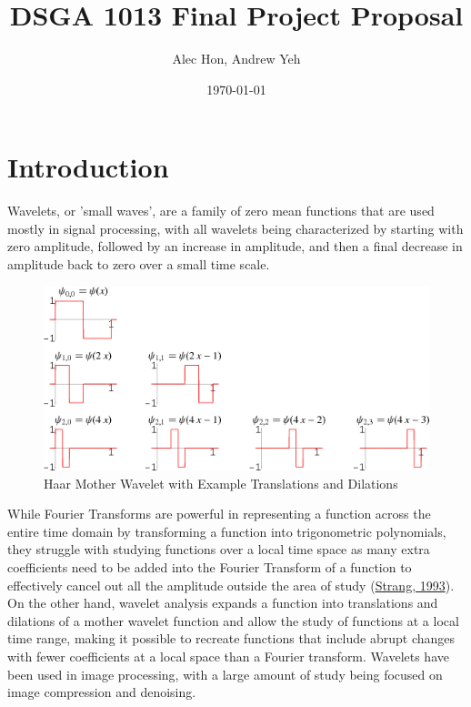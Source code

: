 \documentclass{article}
\begin{document}
\title{\large DSGA 1013 Final Project Proposal}
\author{\small Alec Hon, Andrew Yeh}
\date{\footnotesize \today}
\maketitle

\section{Introduction}

Wavelets, or 'small waves', are a family of zero mean functions that are used mostly in signal processing, with all wavelets being characterized by starting with zero amplitude, followed by an increase in amplitude, and then a final decrease in amplitude back to zero over a small time scale. 
\begin{figure}[h]
\caption{Haar Mother Wavelet with Example Translations and Dilations}
\includegraphics[scale = 0.6]{img/haar_2.png}
\centering
\end{figure}

\noindent
While Fourier Transforms are powerful in representing a function across the entire time domain by transforming a function into trigonometric polynomials, they struggle with studying functions over a local time space as many extra coefficients need to be added into the Fourier Transform of a function to effectively cancel out all the amplitude outside the area of study (\href{https://www.ams.org/journals/bull/1993-28-02/S0273-0979-1993-00390-2/S0273-0979-1993-00390-2.pdf}{Strang, 1993}). On the other hand, wavelet analysis expands a function into translations and dilations of a mother wavelet function and allow the study of functions at a local time range,  making it possible to recreate functions that include abrupt changes with fewer coefficients at a local space than a Fourier transform. Wavelets have been used in image processing, with a large amount of study being focused on image compression and denoising.  
 \newline
 
\end{document}
